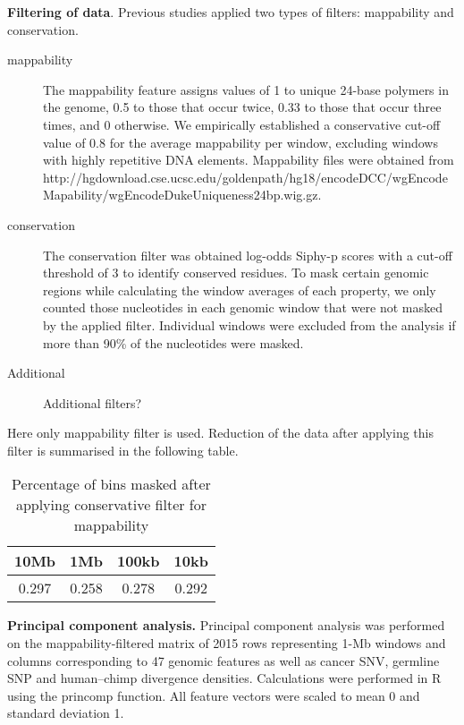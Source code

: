 \documentclass[11pt, oneside]{article}     %
\begin{document}
 \textbf{Filtering of data}. Previous studies applied two types of filters:  mappability and conservation.
\begin{description} 
\item[mappability] The mappability feature assigns values of 1 to
unique 24-base polymers in the genome, 0.5 to those that occur twice, 0.33 to those
that occur three times, and 0 otherwise. We empirically established a conservative
cut-off value of 0.8 for the average mappability per window, excluding windows
with highly repetitive DNA elements. 
Mappability files were obtained from 
\\ http://hgdownload.cse.ucsc.edu/goldenpath/hg18/encodeDCC/wgEncodeMapability/wgEncodeDukeUniqueness24bp.wig.gz. 
\item[conservation]  The conservation filter was obtained log-odds Siphy-p scores with a
cut-off threshold of 3 to identify conserved residues. To mask certain genomic
regions while calculating the window averages of each property, we only counted
those nucleotides in each genomic window that were not masked by the applied
filter. Individual windows were excluded from the analysis if more than 90\% of the
nucleotides were masked. 
\item[Additional]  Additional filters?
\end{description}
Here only mappability filter is used. Reduction of the data after applying this filter is summarised in the following table. 
\begin{table}[ht]
\caption{ Percentage of bins masked after applying conservative filter for mappability} %
\centering  %
\begin{tabular}{c c c c} %
\hline\hline                        %
10Mb & 1Mb &100kb & 10kb \\ [0.5ex] %
\hline                  %
0.297 & 0.258 & 0.278 & 0.292  \\ %
\hline %
\end{tabular}
\label{table:nonlin} %
\end{table}


\textbf{Principal component analysis.}
Principal component analysis was performed on
the mappability-filtered matrix of 2015 rows representing 1-Mb windows and
columns corresponding to 47 genomic features as well as cancer SNV, germline
SNP and human–chimp divergence densities. Calculations were performed in R
using the princomp function. All feature vectors were scaled to mean 0 and
standard deviation 1.
\end{document}
